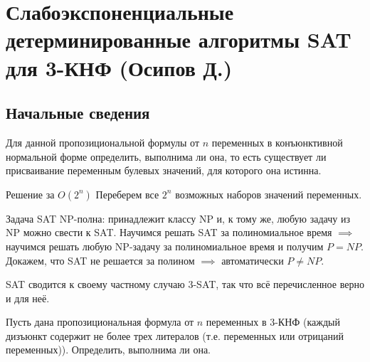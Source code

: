 \hypertarget{3sat}{}
\section{Слабоэкспоненциальные детерминированные алгоритмы SAT для 3-КНФ (Осипов Д.)}
\subsection{Начальные сведения}
\begin{problem*}[SAT]
Для данной пропозициональной формулы от $n$ переменных в конъюнктивной нормальной форме определить, выполнима ли она, то есть существует ли присваивание переменным булевых значений, для которого она истинна.
\end{problem*}

\begin{algodescription}{Решение за $O(2^n)$}
    Переберем все $2^n$ возможных наборов значений переменных.
\end{algodescription}

\begin{nb*}
    Задача SAT NP-полна: принадлежит классу NP и, к тому же, любую задачу из NP можно свести к SAT. Научимся решать SAT за полиномиальное время $\implies$ научимся решать любую NP-задачу за полиномиальное время и получим $P=NP$. Докажем, что SAT не решается за полином $\implies$ автоматически $P\neq NP$.
\end{nb*}

\begin{nb*}
	SAT сводится к своему частному случаю 3-SAT, так что всё перечисленное верно и для неё.
\end{nb*}

\begin{problem*}[3-SAT]
	Пусть дана пропозициональная формула от $n$ переменных в 3-КНФ (каждый дизъюнкт содержит не более трех литералов (т.е. переменных или отрицаний переменных)). Определить, выполнима ли она.
\end{problem*}


